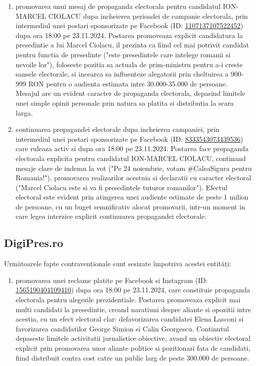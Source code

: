 \documentclass[a4paper,12pt]{article}
\begin{document}
\begin{enumerate}[leftmargin=*, label=\arabic*.)]
    \item promovarea unui mesaj de propaganda electorala pentru candidatul ION-MARCEL CIOLACU dupa incheierea perioadei de campanie electorala, prin intermediul unei postari sponsorizate pe Facebook (ID: \href{https://www.facebook.com/ads/library/?id=1107137107522452}{1107137107522452}) dupa ora 18:00 pe 23.11.2024. Postarea promoveaza explicit candidatura la presedintie a lui Marcel Ciolacu, il prezinta ca fiind cel mai potrivit candidat pentru functia de presedinte ("este presedintele care intelege romanii si nevoile lor"), foloseste pozitia sa actuala de prim-ministru pentru a-i creste sansele electorale, si incearca sa influenteze alegatorii prin cheltuirea a 900-999 RON pentru o audienta estimata intre 30.000-35.000 de persoane. Mesajul are un evident caracter de propaganda electorala, depasind limitele unei simple opinii personale prin natura sa platita si distributia la scara larga.
    \item continuarea propagandei electorale dupa incheierea campaniei, prin intermediul unei postari sponsorizate pe Facebook (ID: \href{https://www.facebook.com/ads/library/?id=8333543073439536}{8333543073439536}) care ruleaza activ si dupa ora 18:00 pe 23.11.2024. Postarea face propaganda electorala explicita pentru candidatul ION-MARCEL CIOLACU, continand mesaje clare de indemn la vot ("Pe 24 noiembrie, votam \#CaleaSigura pentru Romania!"), promovarea realizarilor acestuia si declaratii cu caracter electoral ("Marcel Ciolacu este si va fi presedintele tuturor romanilor"). Efectul electoral este evident prin atingerea unei audiente estimate de peste 1 milion de persoane, cu un buget semnificativ alocat promovarii, intr-un moment in care legea interzice explicit continuarea propagandei electorale.
\end{enumerate}

\vspace{0.5cm}

\subsection{DigiPres.ro}
Următoarele fapte contravenționale sunt sesizate împotriva acestei entități:

\begin{enumerate}[leftmargin=*, label=\arabic*.)]
    \item promovarea unei reclame platite pe Facebook si Instagram (ID: \href{https://www.facebook.com/ads/library/?id=1565190404109410}{1565190404109410}) dupa ora 18:00 pe 23.11.2024, care constituie propaganda electorala pentru alegerile prezidentiale. Postarea promoveaza explicit mai multi candidati la presedintie, creand naratiuni despre aliante si opozitii intre acestia, cu un efect electoral clar: defavorizarea candidatei Elena Lasconi si favorizarea candidatilor George Simion si Calin Georgescu. Continutul depaseste limitele activitatii jurnalistice obiective, avand un obiectiv electoral explicit prin promovarea unor aliante politice si pozitionari fata de candidati, fiind distribuit contra cost catre un public larg de peste 300.000 de persoane.
\end{enumerate}
\end{document}
